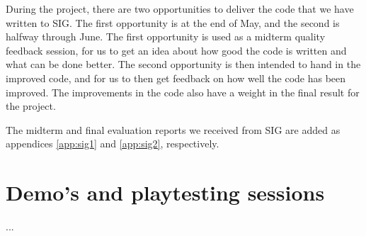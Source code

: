 		During the project, there are two opportunities to deliver the code 
		that we have written to SIG. The first opportunity is at the end of 
		May, and the second is halfway through June. The first opportunity 
		is used as a midterm quality feedback session, for us to get an idea 
		about how good the code is written and what can be done better. The 
		second opportunity is then intended to hand in the improved code, 
		and for us to then get feedback on how well the code has been improved. 
		The improvements in the code also have a weight in the final result 
		for the project.
		
		The midterm and final evaluation reports we received from SIG are added
		as appendices \ref{app:sig1} and \ref{app:sig2}, respectively.
		
	\section{Demo's and playtesting sessions} \label{sec:demos}
		...
